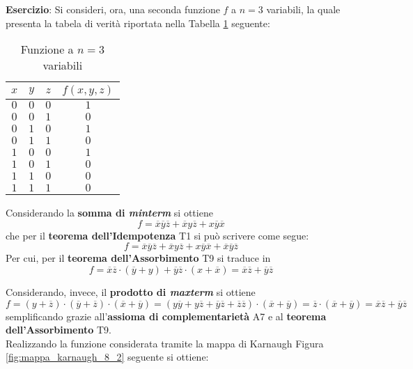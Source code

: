 \documentclass[a4paper]{extarticle}
\renewcommand\arraystretch{}
\begin{document}
\vspace{2em}
\noindent
\textbf{Esercizio}: Si consideri, ora, una seconda funzione \(f\) a \(n = 3\) variabili, la quale presenta la tabela di verità riportata nella Tabella \ref{tab:funzione_3_variabili_1} seguente:

\begin{table}[H]
    \centering
    \setlength{\tabcolsep}{8pt}
    \renewcommand{\arraystretch}{1.2}
    \begin{tabular}{ccc|c}
      $x$ & $y$ & $z$ & $f(x, y, z)$\\
      \hline
      $0$ & $0$ & $0$ & $1$\\
      $0$ & $0$ & $1$ & $0$\\
      $0$ & $1$ & $0$ & $1$\\
      $0$ & $1$ & $1$ & $0$\\
      $1$ & $0$ & $0$ & $1$\\
      $1$ & $0$ & $1$ & $0$\\
      $1$ & $1$ & $0$ & $0$\\
      $1$ & $1$ & $1$ & $0$\\
    \end{tabular}
    \caption{Funzione a \(n = 3\) variabili}
    \label{tab:funzione_3_variabili_1}
\end{table}

\noindent
Considerando la \textbf{somma di \textit{minterm}} si ottiene
\[f = \overline{x}\overline{y}\overline{z} + \overline{x}y\overline{z} + x\overline{y}\overline{x}\]
che per il \textbf{teorema dell'Idempotenza} T1 si può scrivere come segue:
\[f = \overline{x}\overline{y}\overline{z} + \overline{x}y\overline{z} + x\overline{y}\overline{x} + \overline{x} \overline{y} \overline{z}\]
Per cui, per il \textbf{teorema dell'Assorbimento} T9 si traduce in
\[f = \overline{x}\overline{z} \cdot (\overline{y} + y) + \overline{y}\overline{z} \cdot (x + \overline{x}) = \overline{x} \overline{z} + \overline{y}\overline{z}\]

\vspace{1em}
\noindent
Considerando, invece, il \textbf{prodotto di \textit{maxterm}} si ottiene
\[f = (y + \overline{z}) \cdot (\overline{y} + \overline{z}) \cdot (\overline{x} + \overline{y}) = (y \overline{y} + y \overline{z} + \overline{y}\overline{z} + \overline{z} \overline{z}) \cdot (\overline{x} + \overline{y}) = \overline{z} \cdot (\overline{x} + \overline{y}) = \overline{x} \overline{z} + \overline{y} \overline{z}\]
semplificando grazie all'\textbf{assioma di complementarietà} A7 e al \textbf{teorema dell'Assorbimento} T9.\\
Realizzando la funzione considerata tramite la mappa di Karnaugh Figura \ref{fig:mappa_karnaugh_8_2} seguente si ottiene:
\end{document}
